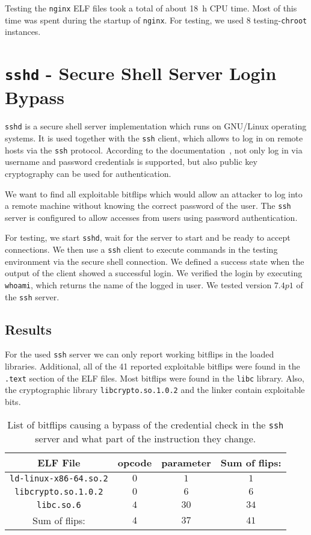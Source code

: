 Testing the \texttt{nginx} ELF files took a total of about \SI{18}{\hour} CPU
time. Most of this time was spent during the startup of \texttt{nginx}.
For testing, we used \num{8} testing-\texttt{chroot} instances.

\section{\texttt{sshd} - Secure Shell Server Login Bypass}

\texttt{sshd} is a secure shell server implementation which runs on GNU/Linux
operating systems. It is used together with the \texttt{ssh} client, which
allows to log in on remote hosts via the \texttt{ssh} protocol. According to the
documentation~\cite{sshman}, not only log in via username and password
credentials is supported, but also public key cryptography can be used for
authentication.

We want to find all exploitable bitflips which would allow an attacker to log
into a remote machine without knowing the correct password of the user. The
\texttt{ssh} server is configured to allow accesses from users using password
authentication.

For testing, we start \texttt{sshd}, wait for the server to start and be ready
to accept connections. We then use a \texttt{ssh} client to execute commands in
the testing environment via the secure shell connection. We defined a success
state when the output of the client showed a successful login. We verified the
login by executing \texttt{whoami}, which returns the name of the logged in
user. We tested version $7.4p1$ of the \texttt{ssh} server.

\subsection{Results}

For the used \texttt{ssh} server we can only report working bitflips in the
loaded libraries. Additional, all of the \num{41} reported exploitable bitflips
were found in the \texttt{.text} section of the ELF files. Most bitflips were
found in the \texttt{libc} library. Also, the cryptographic library
\texttt{libcrypto.so.1.0.2} and the linker contain exploitable bits.

\begin{table}[!htb]
\centering
\begin{tabular}{c|cc|c}
ELF File & opcode & parameter & Sum of flips:      \\ \hline
\texttt{ld-linux-x86-64.so.2} & $0$ & $1$  & $1$   \\
\texttt{libcrypto.so.1.0.2}   & $0$ & $6$  & $6$   \\
\texttt{libc.so.6}            & $4$ & $30$ & $34$  \\ \hline
Sum of flips:                 & $4$ & $37$ & $41$
\end{tabular}
\caption{List of bitflips causing a bypass of the credential check in the
\texttt{ssh} server and what part of the instruction they change.}
\label{tab:sshflips}
\end{table}


